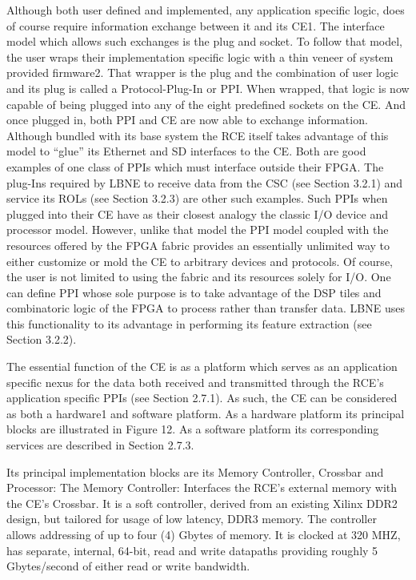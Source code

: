 Although both user defined and implemented, any application specific logic, does of course require information exchange between it and its CE1. The interface model which allows such exchanges is the plug and socket. To follow that model, the user wraps their implementation specific logic with a thin veneer of system provided firmware2. That wrapper is the plug and the combination of user logic and its plug is called a Protocol-Plug-In or PPI. When wrapped, that logic is now capable of being plugged into any of the eight predefined sockets on the CE. And once plugged in, both PPI and CE are now able to exchange information.
Although bundled with its base system the RCE itself takes advantage of this model to “glue” its Ethernet and SD interfaces to the CE. Both are good examples of one class of PPIs which must interface outside their FPGA. The plug-Ins required by LBNE to receive data from the CSC (see Section 3.2.1) and service its ROLs (see Section 3.2.3) are other such examples. Such PPIs when plugged into their CE have as their closest analogy the classic I/O device and processor model. However, unlike that model the PPI model coupled with the resources offered by the FPGA fabric provides an essentially unlimited way to either customize or mold the CE to arbitrary devices and protocols. Of course, the user is not limited to using the fabric and its resources solely for I/O. One can define PPI whose sole purpose is to take advantage of the DSP tiles and combinatoric logic of the FPGA to process rather than transfer data. LBNE uses this functionality to its advantage in performing its feature extraction (see Section 3.2.2).

The essential function of the CE is as a platform which serves as an application specific nexus for the data both received and transmitted through the RCE's application specific PPIs (see Section 2.7.1). As such, the CE can be considered as both a hardware1 and software platform. As a hardware platform its principal blocks are illustrated in Figure 12. As a software platform its corresponding services are described in Section 2.7.3.

Its principal implementation blocks are its Memory Controller, Crossbar and Processor:
The Memory Controller: Interfaces the RCE's external memory with the CE's Crossbar. It is a soft controller, derived from an existing Xilinx DDR2 design, but tailored for usage of low latency, DDR3 memory. The controller allows addressing of up to four (4) Gbytes of memory. It is clocked at 320 MHZ, has separate, internal, 64-bit, read and write datapaths providing roughly 5 Gbytes/second of either read or write bandwidth.

